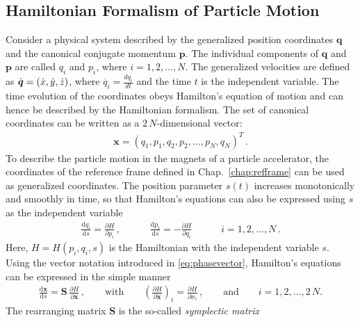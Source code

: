 \subsection{Hamiltonian Formalism of Particle Motion} \label{chap:hamiltonian}

Consider a physical system described by the generalized position coordinates $\mathbf{q}$ and the canonical conjugate momentum $\mathbf{p}$. The individual components of  $\mathbf{q}$ and $\mathbf{p}$  are called $q_i$ and $p_i$, where $i=1,2,...,N$. The generalized velocities are defined as $\dot{\boldsymbol{q}} = (\dot{x},\dot{y},\dot{z})$, where $\dot{q_i} = \frac{d q_i}{dt}$ and the time $t$ is the independent variable. The time evolution of the coordinates obeys Hamilton's equation of motion and can hence be described by the Hamiltonian formalism. The set of canonical coordinates can be written as a $2\,N$-dimensional vector:
\begin{align}
\mathbf{x} = (q_1,p_1,q_2,p_2,...,p_N,q_N)^T \, . \label{eq:phasevector}
\end{align}
%
To describe the particle motion in the magnets of a particle accelerator, the coordinates of the reference frame defined in Chap.~\ref{chap:refframe} can be used as generalized coordinates.
\newpage
The position parameter $s(t)$ increases monotonically and smoothly in time, so that Hamilton's equations can also be expressed using $s$ as the independent variable~\cite{feynmanlectures,rees_symplecticity}
%
\begin{align}
\frac{\mathrm{d} q_i}{\mathrm{d}s} = \frac{\partial H}{\partial p_i} \, , \quad \quad \quad \frac{\mathrm{d} p_i}{\mathrm{d}s} = -\frac{\partial H}{\partial q_i} \quad \quad \quad i=1,2,...,N\, . \label{eq:hamiltons}
\end{align}
%
Here, $H=H(p_i,q_i,s)$ is the Hamiltonian with the independent variable $s$. Using the vector notation introduced in \eqref{eq:phasevector}, Hamilton's equations can be expressed in the simple manner
%
\begin{align}
\frac{\mathrm{d} \mathbf{x}}{\mathrm{d}s} = \mathbf{S} \, \frac{\partial H}{\partial \mathbf{x}} \, , \quad \quad \text{with} \quad \quad \left( \frac{\partial H}{\partial \mathbf{x}} \right)_i = \frac{\partial H}{\partial x_i} \,, \quad \quad \text{and} \quad \quad i=1,2,...,2\,N . \label{eq:symplecticform}
\end{align}
%
The rearranging matrix $\mathbf{S}$ is the so-called \emph{symplectic matrix}
